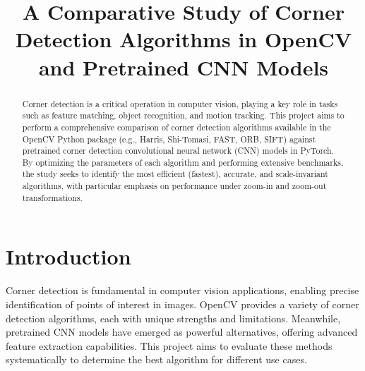 \documentclass[journal]{IEEEtran}
\begin{document}
\title{A Comparative Study of Corner Detection Algorithms in OpenCV and Pretrained CNN Models}

\author{
\vspace{-10pt}
}

\maketitle

\begin{abstract}
Corner detection is a critical operation in computer vision, playing a key role in tasks such as feature matching, object recognition, and motion tracking. This project aims to perform a comprehensive comparison of corner detection algorithms available in the OpenCV Python package (e.g., Harris, Shi-Tomasi, FAST, ORB, SIFT) against pretrained corner detection convolutional neural network (CNN) models in PyTorch. By optimizing the parameters of each algorithm and performing extensive benchmarks, the study seeks to identify the most efficient (fastest), accurate, and scale-invariant algorithms, with particular emphasis on performance under zoom-in and zoom-out transformations.
\end{abstract}

\section{Introduction}
Corner detection is fundamental in computer vision applications, enabling precise identification of points of interest in images. OpenCV provides a variety of corner detection algorithms, each with unique strengths and limitations. Meanwhile, pretrained CNN models have emerged as powerful alternatives, offering advanced feature extraction capabilities. This project aims to evaluate these methods systematically to determine the best algorithm for different use cases.
\end{document}
